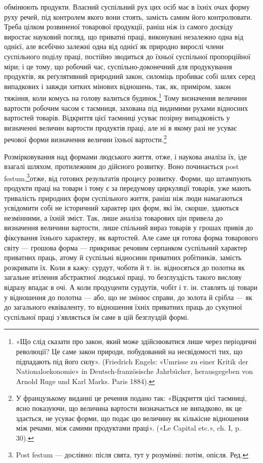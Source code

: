 \parcont{}  %
обмінюють продукти. Власний суспільний рух цих осіб має в
їхніх очах форму руху речей, під контролем якого вони стоять,
замість самим його контролювати. Треба цілком розвиненої товарової
продукції, раніш ніж із самого досвіду виростає науковий
погляд, що приватні праці, виконувані незалежно одна від однієї,
але всебічно залежні одна від однієї як природно вирослі члени
суспільного поділу праці, постійно зводиться до їхньої суспільної
пропорційної міри; і це тому, що робочий час, суспільно-доконечний
для продукування продуктів, як реґулятивний природний
закон, силоміць пробиває собі шлях серед випадкових і завжди
хитких мінових відношень, так, як, приміром, закон тяжіння,
коли комусь на голову валиться будинок.\footnote{
«Що слід сказати про закон, який може здійснюватися лише
через періодичні революції? Це саме закон природи, побудований на
несвідомості тих, що підпадають під його силу». (Friedrich Engels: «Umrisse
zu einer Kritik der Nationaloekonomie» in Deutsch-französische
Jahrbücher, herausgegeben von Arnold Ruge und Karl Marks. Paris 1884).
} Тому визначення
величини вартости робочим часом є таємниця, захована під видимими
рухами відносних вартостей товарів. Відкриття цієї таємниці
усуває позірну випадковість у визначенні величин вартости
продуктів праці, але ні в якому разі не усуває речової форми визначення
величин їхньої вартости.\footnote*{
У французькому виданні це речення подано так: «Відкриття цієї
таємниці, ясно показуючи, що величина вартости визначається не випадково,
як це здається, не усуває форми, що подає цю величину як кількісне
відношення між речами, між самими продуктами праці». («Le Capital
etc.», ch. I, p. 30).
}

Розмірковування над формами людського життя, отже, і наукова
аналіза їх, іде взагалі шляхом, протилежним до дійсного
розвитку. Воно починається post festum,\footnote*{
Post festum — дослівно: після свята, тут у розумінні: потім,
опісля. Ред.
}отже, від готових результатів
процесу розвитку. Форми, що штампують продукти
праці на товари і тому є за передумову циркуляції товарів, уже
мають тривалість природних форм суспільного життя, раніш ніж
люди намагаються усвідомити собі не історичний характер цих
форм, які їм, скорше, здаються незмінними, а їхній зміст. Так,
лише аналіза товарових цін привела до визначення величини вартости,
лише спільний вираз товарів у грошах привів до фіксування
їхнього характеру, як вартостей. Але саме ця готова форма
товарового світу — грошова форма — прикриває речовим серпанком
суспільний характер приватних праць, атому й суспільні
відносини приватних робітників, замість розкривати їх. Коли я
кажу: сурдут, чоботи й т. ін. відносяться до полотна як загальне
втілення абстрактної людської праці, то безглуздість такого
вислову відразу впадає в очі. А коли продуценти сурдутів, чобіт
і т. ін. ставлять ці товари у відношення до полотна — або, що не
змінює справи, до золота й срібла — як до загального еквіваленту,
то відношення їхніх приватних праць до сукупної суспільної
праці з’являється їм саме в цій безглуздій формі.

